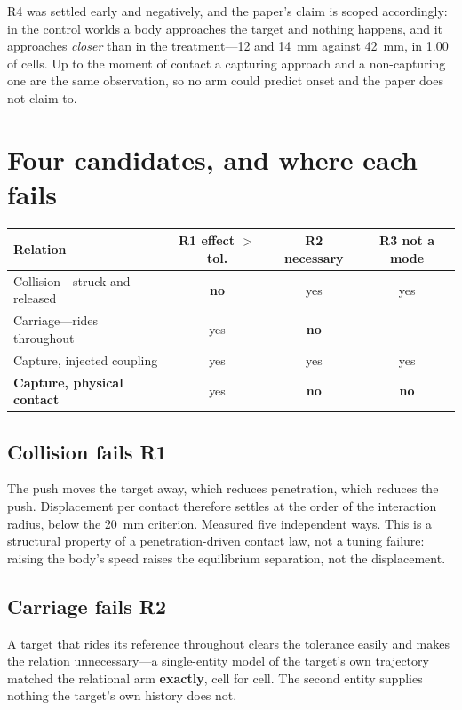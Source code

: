 \documentclass[10pt]{article}
\begin{document}
R4 was settled early and negatively, and the paper's claim is scoped accordingly:
in the control worlds a body approaches the target and nothing happens, and it
approaches \emph{closer} than in the treatment---12 and 14~mm against 42~mm, in
1.00 of cells. Up to the moment of contact a capturing approach and a
non-capturing one are the same observation, so no arm could predict onset and the
paper does not claim to.

\section{Four candidates, and where each fails}

\begin{center}
\begin{tabular}{@{}lccc@{}}
\toprule
Relation & R1 effect \(>\) tol. & R2 necessary & R3 not a mode \\
\midrule
Collision---struck and released & \textbf{no} & yes & yes \\
Carriage---rides throughout & yes & \textbf{no} & --- \\
Capture, injected coupling & yes & yes & yes \\
\textbf{Capture, physical contact} & yes & \textbf{no} & \textbf{no} \\
\bottomrule
\end{tabular}
\end{center}

\subsection{Collision fails R1}

The push moves the target away, which reduces penetration, which reduces the
push. Displacement per contact therefore settles at the order of the interaction
radius, below the 20~mm criterion. Measured five independent ways. This is a
structural property of a penetration-driven contact law, not a tuning failure:
raising the body's speed raises the equilibrium separation, not the displacement.

\subsection{Carriage fails R2}

A target that rides its reference throughout clears the tolerance easily and
makes the relation unnecessary---a single-entity model of the target's own
trajectory matched the relational arm \textbf{exactly}, cell for cell. The second
entity supplies nothing the target's own history does not.
\end{document}
